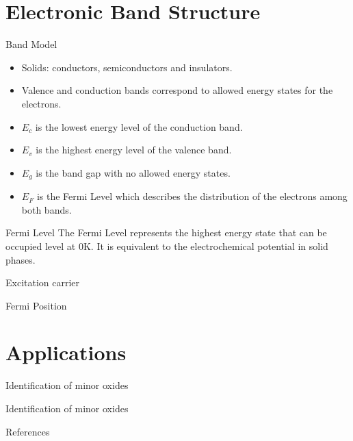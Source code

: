 \documentclass[10pt,compress]{beamer}
\begin{document}
\section{Electronic Band Structure}
\begin{frame}[allowframebreaks=1.0]{Band Model}
    \begin{itemize}
        \item Solids: conductors, semiconductors and insulators. 
        \item Valence and conduction bands correspond to allowed energy states for the electrons. 
        \item $E_c$ is the lowest energy level of the conduction band.
        \item $E_v$ is the highest energy level of the valence band.
        \item $E_g$ is the band gap with no allowed energy states. 
        \item $E_F$ is the Fermi Level which describes the distribution of the electrons among both bands.
    \end{itemize}
    
    \begin{alertblock}{Fermi Level}
        \footnotesize
        The Fermi Level represents the highest energy state that can be occupied level at 0K. 
        It is equivalent to the electrochemical potential in solid phases.
    \end{alertblock}
    
\end{frame}

\begin{frame}{Excitation carrier}
    
\end{frame}

\begin{frame}{Fermi Position}
    
\end{frame}




\section{Applications}
\begin{frame}{Identification of minor oxides}

\end{frame}

\begin{frame}{Identification of minor oxides}

\end{frame}





\begin{frame}[allowframebreaks=0.9]{References}
\AtNextBibliography{\tiny}
\nocite{*}
\printbibliography
\end{frame}
\end{document}
